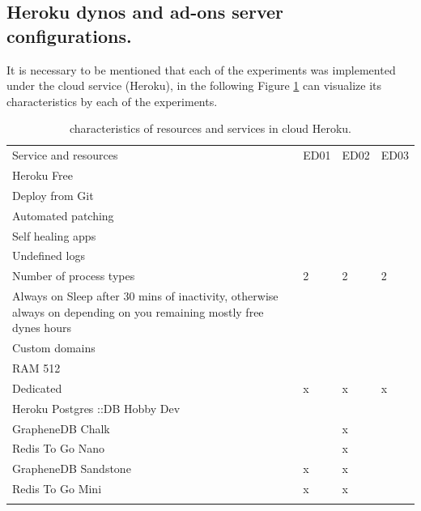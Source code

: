 \subsection{Heroku dynos and ad-ons server configurations.}
It is necessary to be mentioned that each of the experiments was implemented
under the cloud service (Heroku), in the following Figure \ref{tab:heroku} can
visualize its characteristics by each of the experiments.
\begin{table}
	\small
	\caption{characteristics of  resources and services in cloud Heroku.	}
	\label{tab:heroku}
	\centering
	\small
	\begin{tabular}{p{4cm} p{3cm} p{3cm} p{3cm}  }
		\hline\noalign{\smallskip}
		Service and resources & ED01 & ED02 & ED03 \\
		\noalign{\smallskip}\hline\noalign{\smallskip}
		\small{Heroku Free} & \small{\checkmark} & \small{\checkmark} & \small{\checkmark}\\ \hline
		\small{Deploy from Git} & \small{\checkmark} & \small{\checkmark} & \small{\checkmark}\\ \hline
		\small{Automated patching} & \small{\checkmark} & \small{\checkmark} & \small{\checkmark}\\ \hline
		\small{Self healing apps} & \small{\checkmark} & \small{\checkmark} & \small{\checkmark}\\ \hline
		\small{Undefined logs} & \small{\checkmark} & \small{\checkmark} & \small{\checkmark}\\ \hline
		\small{Number of process types} & \small{2} & \small{2} & \small{2}\\ \hline
		\small{Always on Sleep after 30 mins of inactivity, otherwise always on depending on you remaining mostly free dynes hours} & \small{\checkmark} & \small{\checkmark} & \small{\checkmark}\\ \hline
		\small{Custom domains} & \small{\checkmark} & \small{\checkmark} & \small{\checkmark}\\ \hline
		\small{RAM 512} & \small{\checkmark} & \small{\checkmark} & \small{\checkmark}\\ \hline
		\small{Dedicated} & \small{x} & \small{x} & \small{x}\\ \hline
		\small{Heroku Postgres ::DB Hobby Dev} & \small{\checkmark} & \small{\checkmark} & \small{\checkmark}\\ \hline
		\small{GrapheneDB Chalk} & \small{\checkmark} & \small{x} & \small{\checkmark}\\ \hline
		\small{Redis To Go Nano} & \small{\checkmark} & \small{x} & \small{\checkmark}\\ \hline
		\small{GrapheneDB Sandstone} & \small{x} & \small{x} & \small{\checkmark}\\ \hline
		\small{Redis To Go Mini} & \small{x} & \small{x} & \small{\checkmark}\\ \hline


		\noalign{\smallskip}\hline
	\end{tabular}
\end{table}


